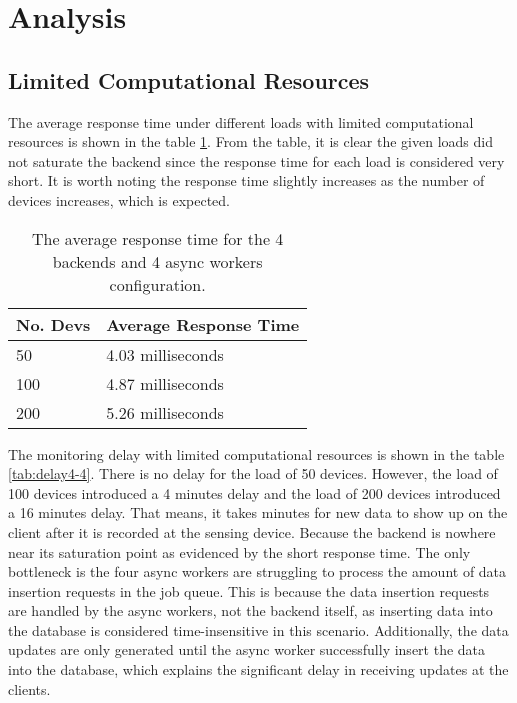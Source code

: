 \documentclass[../thesis.tex]{subfiles}
\begin{document}
\section{Analysis}

\subsection{Limited Computational Resources}

The average response time under different loads with limited computational resources is shown in the table \ref{tab:avg4-4}. From the table, it is clear the given loads did not saturate the backend since the response time for each load is considered very short. It is worth noting the response time slightly increases as the number of devices increases, which is expected.

\begin{table}[h!]
\begin{center}
\caption{The average response time for the 4 backends and 4 async workers configuration.}
\label{tab:avg4-4}
\begin{tabular}{l|l}
\toprule
\textbf{No. Devs} & \textbf{Average Response Time}\\
\midrule
50 & 4.03 milliseconds\\
100 & 4.87 milliseconds\\
200 & 5.26 milliseconds\\
\bottomrule
\end{tabular}
\end{center}
\end{table}

The monitoring delay with limited computational resources is shown in the table \ref{tab:delay4-4}. There is no delay for the load of 50 devices. However, the load of 100 devices introduced a 4 minutes delay and the load of 200 devices introduced a 16 minutes delay. That means, it takes minutes for new data to show up on the client after it is recorded at the sensing device. Because the backend is nowhere near its saturation point as evidenced by the short response time. The only bottleneck is the four async workers are struggling to process the amount of data insertion requests in the job queue. This is because the data insertion requests are handled by the async workers, not the backend itself, as inserting data into the database is considered time-insensitive in this scenario. Additionally, the data updates are only generated until the async worker successfully insert the data into the database, which explains the significant delay in receiving updates at the clients.
\end{document}
